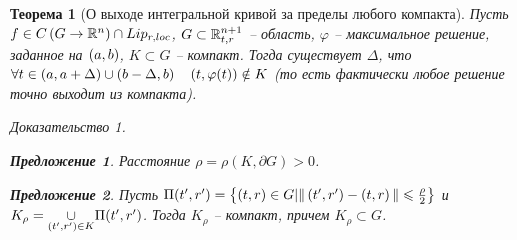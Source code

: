 \documentclass[a5paper, 10pt]{article}
\theoremstyle{definition}
\theoremstyle{plain}
\newtheorem{Th}{Теорема}
\newtheorem*{Prop}{Предложение}
\theoremstyle{remark}
\newtheorem*{Proof}{Доказательство}
\begin{document}
	\begin{Th}[О выходе интегральной кривой за пределы любого компакта]
		Пусть $f\in C\left(G\rightarrow \mathbb{R}^n\right) \cap Lip_{r, loc}$, $G\subset \mathbb{R}_{t,r}^{n+1}$ -- область, $\varphi$ -- максимальное решение, заданное на $\left(a,b\right)$, $K \subset G$ -- компакт. Тогда существует $\Delta$, что $\forall t\in\left(a, a+\Delta\right)\cup\left(b-\Delta, b\right) \quad \left(t,\varphi(t)\right) \notin K$ (то есть фактически любое решение точно выходит из компакта).
		\begin{Proof}
			\begin{Prop}
				Расстояние $\rho = \rho(K, \partial G) > 0$.
			\end{Prop}
			\begin{Prop}
				Пусть $\Pi(t',r') = \left\{\left(t,r\right)\in G | \|\left(t',r'\right) - \left(t,r\right)\|\leqslant \frac{\rho}{2}\right\}$ и $K_{\rho} = \underset{\left(t',r'\right)\in K}{\cup} \Pi(t',r')$. Тогда $K_{\rho}$ -- компакт, причем $K_{\rho} \subset G$.
			\end{Prop}
		\end{Proof}
	\end{Th}
\end{document}
